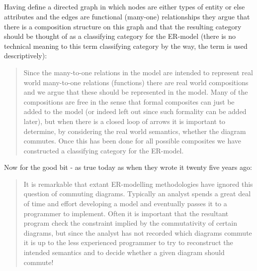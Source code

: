\documentclass[10pt,a4paper]{scrartcl}
\begin{document}
\subsection{\cite{Johnson93}      }
Having define a directed graph in which nodes are either types of entity or
else attributes and the edges are functional (many-one) relationships
they argue that there is a composition structure on this graph
and that the resulting category should be thought of as a classifying category
for the ER-model (there is no technical meaning to this term classifying category by the way, 
the term is used descriptively):
\begin{quote}
Since the many-to-one relations in the
model are intended to represent real world many-to-one relations (functions)
there are real world compositions and we argue that these should be represented
in the model. Many of the compositions are free in the sense that formal 
composites can just be added to the model (or indeed left out since such formality
can be added later), but when there is a closed loop of arrows it is important to
determine, by considering the real world semantics, whether the diagram commutes. 
Once this has been done for all possible composites we have constructed
a classifying category for the ER-model.
\end{quote}

Now for the good bit - as true today as when they wrote it twenty five years ago:
\begin{quote}
It is remarkable that extant ER-modelling methodologies have ignored this
question of commuting diagrams. Typically an analyst spends a great deal of
time and effort developing a model and eventually passes it to a programmer
to implement. Often it is important that the resultant program check the 
constraint implied by the commutativity of certain diagrams, but since the analyst
has not recorded which diagrams commute it is up to the less experienced 
programmer to try to reconstruct the intended semantics and to decide whether a
given diagram should commute!
\end{quote}
\end{document}
